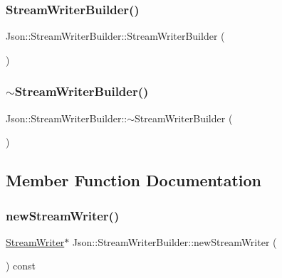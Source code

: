 \subsubsection{\texorpdfstring{Stream\+Writer\+Builder()}{StreamWriterBuilder()}\hspace{0.1cm}{\footnotesize\ttfamily [2/2]}}
{\footnotesize\ttfamily Json\+::\+Stream\+Writer\+Builder\+::\+Stream\+Writer\+Builder (\begin{DoxyParamCaption}{ }\end{DoxyParamCaption})}

\hypertarget{class_json_1_1_stream_writer_builder_a93263f8ef1e2d22593907075d8f0aaef}{}\label{class_json_1_1_stream_writer_builder_a93263f8ef1e2d22593907075d8f0aaef} 
\subsubsection{\texorpdfstring{$\sim$\+Stream\+Writer\+Builder()}{~StreamWriterBuilder()}\hspace{0.1cm}{\footnotesize\ttfamily [2/2]}}
{\footnotesize\ttfamily Json\+::\+Stream\+Writer\+Builder\+::$\sim$\+Stream\+Writer\+Builder (\begin{DoxyParamCaption}{ }\end{DoxyParamCaption})}



\subsection{Member Function Documentation}
\hypertarget{class_json_1_1_stream_writer_builder_a7ed17f52a139202a7bebc85bc79cbca3}{}\label{class_json_1_1_stream_writer_builder_a7ed17f52a139202a7bebc85bc79cbca3} 
\subsubsection{\texorpdfstring{new\+Stream\+Writer()}{newStreamWriter()}\hspace{0.1cm}{\footnotesize\ttfamily [1/2]}}
{\footnotesize\ttfamily \hyperlink{class_json_1_1_stream_writer}{Stream\+Writer}$\ast$ Json\+::\+Stream\+Writer\+Builder\+::new\+Stream\+Writer (\begin{DoxyParamCaption}{ }\end{DoxyParamCaption}) const\hspace{0.3cm}{\ttfamily [virtual]}}


